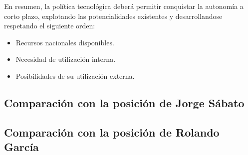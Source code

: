 En resumen, la política tecnológica deberá permitir conquistar la autonomía a corto
plazo, explotando las potencialidades existentes y desarrollandose respetando el siguiente orden:
\begin{itemize}
    \item Recursos nacionales disponibles.
    \item Necesidad de utilización interna.
    \item Posibilidades de su utilización externa.
\end{itemize}

\subsection*{Comparación con la posición de Jorge Sábato}



\subsection*{Comparación con la posición de Rolando García}


